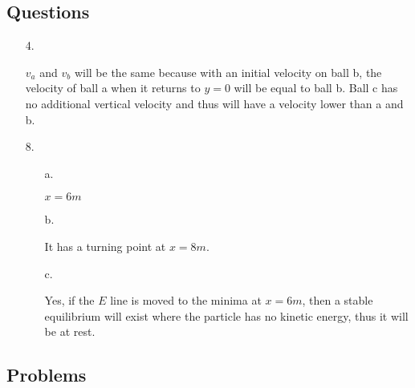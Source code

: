     \subsection*{Questions}

    \begin{itemize}
        \item [4.]
        
            $v_{a}$ and $v_{b}$ will be the same because with an initial velocity on ball b, the velocity of ball a when it returns to $y=0$ will be equal to ball b. Ball c has no additional vertical velocity and thus will have a velocity lower than a and b.

        \item [8.]
        
            \begin{itemize}
                \item [a.]
                
                    $x=6m$

                \item [b.]
                
                    It has a turning point at $x=8m$.
                
                \item [c.]
                
                    Yes, if the $E$ line is moved to the minima at $x=6m$, then a stable equilibrium will exist where the particle has no kinetic energy, thus it will be at rest. 

            \end{itemize}

    \end{itemize}

    \subsection*{Problems}

